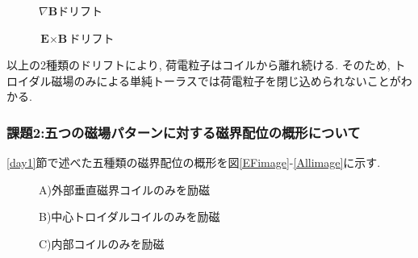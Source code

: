 \documentclass[]{jsarticle}
\begin{document}
		\begin{figure}[htbp]
		\begin{minipage}{0.5\hsize}
			\begin{center}
				\caption{$\nabla \textbf{B}$ドリフト}
				\label{gradB}
			\end{center}
		\end{minipage}
		\begin{minipage}{0.5\hsize}
			\begin{center}
				\caption{$\textbf{E} \times \textbf{B}$ドリフト}
				\label{EcrossB}
			\end{center}
		\end{minipage}
	        \end{figure}

				
		以上の2種類のドリフトにより, 荷電粒子はコイルから離れ続ける. そのため, トロイダル磁場のみによる単純トーラスでは荷電粒子を閉じ込められないことがわかる. 
		
		\subsubsection{課題2:五つの磁場パターンに対する磁界配位の概形について}
		\ref{day1}節で述べた五種類の磁界配位の概形を図\ref{EFimage}-\ref{Allimage}に示す. 
		
		\begin{figure}[htbp]
		\begin{minipage}{0.33\hsize}
			\begin{center}
				\caption{A)外部垂直磁界コイルのみを励磁}
				\label{EFimage}
			\end{center}
		\end{minipage}
		\begin{minipage}{0.33\hsize}
			\begin{center}
				\caption{B)中心トロイダルコイルのみを励磁}
				\label{TFimage}
			\end{center}
		\end{minipage}
		\begin{minipage}{0.33\hsize}
			\begin{center}
				\caption{C)内部コイルのみを励磁}
				\label{PFimage}
			\end{center}
		\end{minipage}
		
	\end{figure}
	
\end{document}
